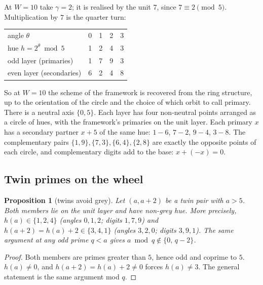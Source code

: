 \documentclass[11pt]{article}
\theoremstyle{plain}
\newtheorem{proposition}[theorem]{Proposition}
\theoremstyle{definition}
\theoremstyle{remark}
\begin{document}
\noindent
At $W=10$ take $\gamma=2$; it is realised by the unit $7$, since $7\equiv2\pmod5$. Multiplication by
$7$ is the quarter turn:
\begin{center}
\begin{tabular}{@{}lcccc@{}}
\toprule
angle $\theta$ & 0 & 1 & 2 & 3\\
hue $h=2^\theta \bmod 5$ & 1 & 2 & 4 & 3\\
\midrule
odd layer (primaries) & 1 & 7 & 9 & 3\\
even layer (secondaries) & 6 & 2 & 4 & 8\\
\bottomrule
\end{tabular}
\qquad
{}
\end{center}

\noindent
So at $W=10$ the scheme of the framework is recovered from the ring structure, up to the
orientation of the circle and the choice of which orbit to call primary. There is a neutral axis
$\{0,5\}$. Each layer has four non-neutral points arranged as a circle of hues, with the framework's
primaries on the unit layer. Each
primary $x$ has a secondary partner $x+5$ of the same hue: $1\!-\!6$, $7\!-\!2$, $9\!-\!4$,
$3\!-\!8$. The complementary pairs $\{1,9\},\{7,3\},\{6,4\},\{2,8\}$ are exactly the opposite points
of each circle, and complementary digits add to the base: $x+(-x)=0$.

\subsection{Twin primes on the wheel}

\begin{proposition}[twins avoid grey]\label{prop:twinhue}
Let $(a,a+2)$ be a twin pair with $a>5$. Both members lie on the unit layer and have non-grey hue.
More precisely, $h(a)\in\{1,2,4\}$ (angles $0,1,2$; digits $1,7,9$) and $h(a+2)=h(a)+2\in\{3,4,1\}$
(angles $3,2,0$; digits $3,9,1$). The same argument at any odd prime $q<a$ gives
$a\bmod q\notin\{0,\,q-2\}$.
\end{proposition}
\begin{proof}
Both members are primes greater than $5$, hence odd and coprime to $5$. $h(a)\ne0$, and
$h(a+2)=h(a)+2\ne0$ forces $h(a)\ne3$. The general statement is the same argument mod $q$.
\end{proof}
\end{document}
